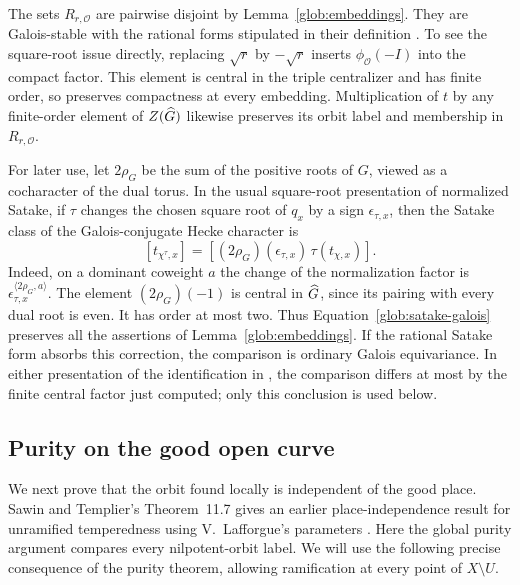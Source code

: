 \begin{remark}\label{glob:signs}
The sets $R_{r,\mathcal O}$ are pairwise disjoint by
Lemma~\ref{glob:embeddings}.  They are Galois-stable with the rational
forms stipulated in their definition
\cite[Section~3.4.2]{GLR}.  To see the square-root issue directly,
replacing $\sqrt r$ by $-\sqrt r$ inserts
$\phi_{\mathcal O}(-I)$ into the compact factor.  This element is
central in the triple centralizer and has finite order, so preserves
compactness at every embedding.  Multiplication of $t$ by any
finite-order element of $Z(\widehat G)$ likewise preserves its orbit label
and membership in $R_{r,\mathcal O}$.

For later use, let $2\rho_G$ be the sum of the positive roots of $G$,
viewed as a cocharacter of the dual torus.  In the usual square-root
presentation of normalized Satake, if $\tau$ changes the
chosen square root of $q_x$ by a sign $\epsilon_{\tau,x}$, then the
Satake class of the Galois-conjugate Hecke character is
\begin{equation}\label{glob:satake-galois}
       [t_{\chi^\tau,x}]
       =[(2\rho_G)(\epsilon_{\tau,x})\,\tau(t_{\chi,x})].
\end{equation}
Indeed, on a dominant coweight $a$ the change of the normalization
factor is $\epsilon_{\tau,x}^{\langle2\rho_G,a\rangle}$.
The element $(2\rho_G)(-1)$ is central in $\widehat G$, since its pairing
with every dual root is even.  It has order at most two.  Thus
Equation~\eqref{glob:satake-galois} preserves all the assertions of
Lemma~\ref{glob:embeddings}.  If the rational Satake form absorbs
this correction, the comparison is ordinary Galois equivariance.
In either presentation of the identification in
\cite[Equation~(3.2)]{GLR}, the comparison differs at most by the
finite central factor just computed; only this conclusion is used below.
\end{remark}

\subsection{Purity on the good open curve}

We next prove that the orbit found locally is independent of the
good place. Sawin and Templier's Theorem~11.7 gives an earlier
place-independence result for unramified temperedness using
V.~Lafforgue's parameters \cite{SawinTemplier}.
Here the global purity argument compares every nilpotent-orbit label.
We will use the following precise consequence of the
purity theorem, allowing ramification at every point of $X\setminus U$.

